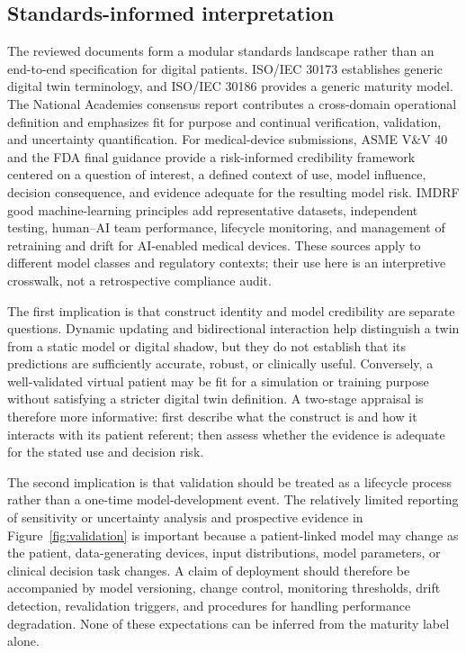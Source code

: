 \subsection{Standards-informed interpretation}

The reviewed documents form a modular standards landscape rather than an end-to-end specification for digital patients. ISO/IEC 30173 establishes generic digital twin terminology, and ISO/IEC 30186 provides a generic maturity model.\cite{isoiec2023digitaltwin,isoiec2025maturity} The National Academies consensus report contributes a cross-domain operational definition and emphasizes fit for purpose and continual verification, validation, and uncertainty quantification.\cite{nasem2024digitaltwins} For medical-device submissions, ASME V\&V 40 and the FDA final guidance provide a risk-informed credibility framework centered on a question of interest, a defined context of use, model influence, decision consequence, and evidence adequate for the resulting model risk.\cite{asme2018vv40,fda2023credibility} IMDRF good machine-learning principles add representative datasets, independent testing, human--AI team performance, lifecycle monitoring, and management of retraining and drift for AI-enabled medical devices.\cite{imdrf2025gmlp} These sources apply to different model classes and regulatory contexts; their use here is an interpretive crosswalk, not a retrospective compliance audit.

The first implication is that construct identity and model credibility are separate questions. Dynamic updating and bidirectional interaction help distinguish a twin from a static model or digital shadow, but they do not establish that its predictions are sufficiently accurate, robust, or clinically useful. Conversely, a well-validated virtual patient may be fit for a simulation or training purpose without satisfying a stricter digital twin definition. A two-stage appraisal is therefore more informative: first describe what the construct is and how it interacts with its patient referent; then assess whether the evidence is adequate for the stated use and decision risk.

The second implication is that validation should be treated as a lifecycle process rather than a one-time model-development event. The relatively limited reporting of sensitivity or uncertainty analysis and prospective evidence in Figure~\ref{fig:validation} is important because a patient-linked model may change as the patient, data-generating devices, input distributions, model parameters, or clinical decision task changes. A claim of deployment should therefore be accompanied by model versioning, change control, monitoring thresholds, drift detection, revalidation triggers, and procedures for handling performance degradation. None of these expectations can be inferred from the maturity label alone.

